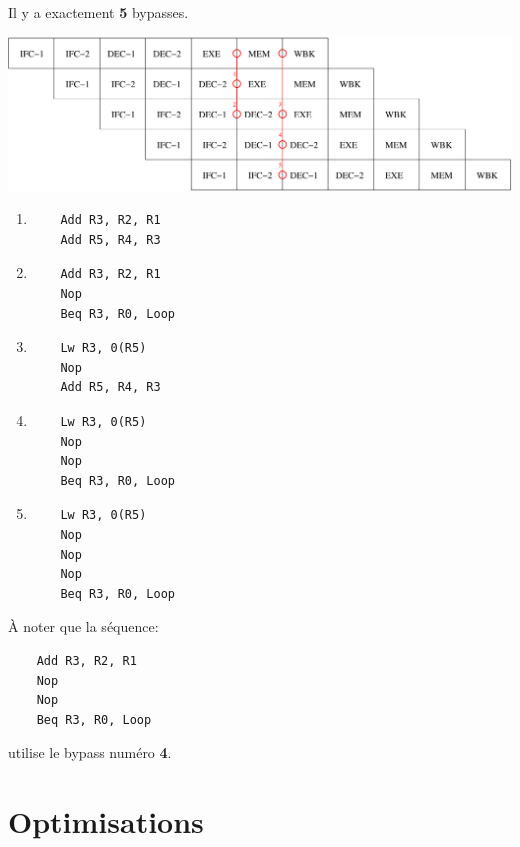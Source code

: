 \begin{correction}

  Il y a exactement \textbf{5} bypasses.

  \begin{center}
    \includegraphics[scale=0.8]{figures/correction-pipeline.pdf}
  \end{center}

  \begin{enumerate}
    \item
      \begin{verbatim}
	Add R3, R2, R1
	Add R5, R4, R3
      \end{verbatim}
    \item
      \begin{verbatim}
	Add R3, R2, R1
	Nop
	Beq R3, R0, Loop
      \end{verbatim}
    \item
      \begin{verbatim}
	Lw R3, 0(R5)
	Nop
	Add R5, R4, R3
      \end{verbatim}
    \item
      \begin{verbatim}
	Lw R3, 0(R5)
	Nop
	Nop
	Beq R3, R0, Loop
      \end{verbatim}
    \item
      \begin{verbatim}
	Lw R3, 0(R5)
	Nop
	Nop
	Nop
	Beq R3, R0, Loop
      \end{verbatim}
  \end{enumerate}

  \`A noter que la s\'equence:

  \begin{verbatim}
    Add R3, R2, R1
    Nop
    Nop
    Beq R3, R0, Loop  
  \end{verbatim}

  utilise le bypass num\'ero \textbf{4}.

\end{correction}

%
%

\section{Optimisations}

